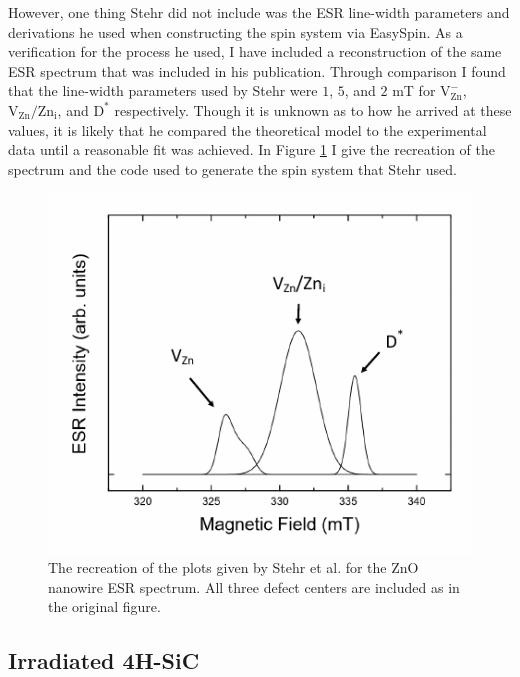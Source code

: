 \documentclass[oneside, astronomy, noacknowlegments]{BYUPhys}
\begin{document}
However, one thing Stehr did not include was the ESR line-width parameters and derivations he used when constructing the spin system via EasySpin. As a verification for the process he used, I have included a reconstruction of the same ESR spectrum that was included in his publication. Through comparison I found that the line-width parameters used by Stehr were $1$, $5$, and $2$ mT for 
$\text{V}_{\text{Zn}}^{-}$, $\text{V}_{\text{Zn}}/\text{Zn}_{\text{i}}$, and $\text{D}^{*}$ respectively. Though it is unknown as to how he arrived at these values, it is likely that he compared the theoretical model to the experimental data until a reasonable fit was achieved. In Figure \ref{fig:StehrRec} I give the recreation of the spectrum and the code used to generate the spin system that Stehr used.


\begin{figure}
    \centerline{\includegraphics{stehr_rec_fig}}
    \caption[Recreation of ZnO Nanowire ESR]{\label{fig:StehrRec}
     The recreation of the plots given by Stehr et al. for the ZnO nanowire ESR spectrum. All three defect centers are included as in the original figure. }
 \end{figure}

\subsection{Irradiated 4H-SiC}
\end{document}

